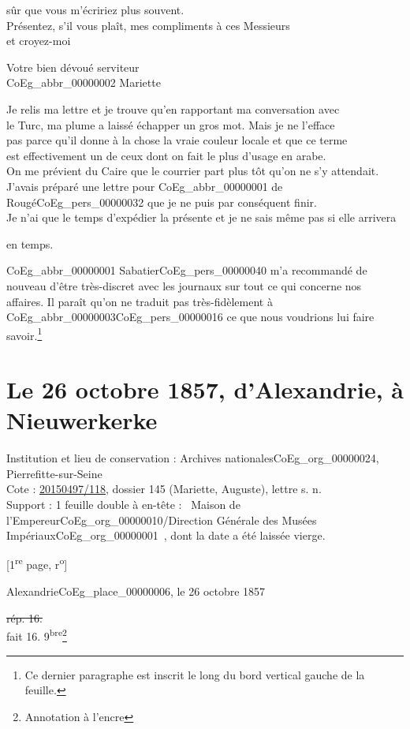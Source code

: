 \documentclass{book}
\begin{document}
sûr que vous m’écririez plus souvent.\\
\indent Présentez, s’il vous plaît, mes compliments à ces Messieurs\\
et croyez-moi
\begin{center}\hspace{5cm} Votre bien dévoué serviteur\\
\hspace{5cm} \gls{CoEg_abbr_00000002} Mariette\end{center}
\indent Je relis ma lettre et je trouve qu’en rapportant ma conversation avec\\
le Turc, ma plume a laissé échapper un gros mot. Mais je ne l’efface\\
pas parce qu’il donne à la chose la vraie couleur locale et que ce terme\\
est effectivement un de ceux dont on fait le plus d’usage en arabe.\\
\indent On me prévient du Caire que le courrier part plus tôt qu’on ne s’y attendait.\\
J’avais préparé une lettre pour \gls{CoEg_abbr_00000001} de Rougé\gls{CoEg_pers_00000032} que je ne puis par conséquent finir.\\
Je n’ai que le temps d’expédier la présente et je ne sais même pas si elle arrivera
\begin{flushright}en temps.\end{flushright}
\indent \gls{CoEg_abbr_00000001} Sabatier\gls{CoEg_pers_00000040} m’a recommandé de nouveau d’être très-discret avec les journaux sur tout ce qui concerne nos\\
affaires. Il paraît qu’on ne traduit pas très-fidèlement à \gls{CoEg_abbr_00000003}\gls{CoEg_pers_00000016} ce que nous voudrions lui faire savoir.\footnote{Ce dernier paragraphe est inscrit le long du bord vertical gauche de la feuille.}
\section*{Le 26 octobre 1857, d'Alexandrie, à Nieuwerkerke} \label{CoEg_Mariette_1857-10-26} 
{\footnotesize \noindent Institution et lieu de conservation : Archives nationales\gls{CoEg_org_00000024}, Pierrefitte-sur-Seine\\
Cote : \hyperref[CoEg_Mariette_ms_001]{20150497/118}, dossier 145 (Mariette, Auguste), lettre s. n.\\
Support : 1 feuille double à en-tête : \og ~Maison de l'Empereur\gls{CoEg_org_00000010}/Direction Générale des Musées Impériaux\gls{CoEg_org_00000001}~\fg, dont la date a été laissée vierge.
\begin{center} {[1\textsuperscript{re} page, r\textsuperscript{o}]}\end{center}}
\begin{flushright}Alexandrie\gls{CoEg_place_00000006}, le 26 octobre 1857\end{flushright} 
\indent \sout{rép. 16.}\\
fait 16. 9\textsuperscript{bre}\footnote{Annotation à l'encre}\\
\end{document}
